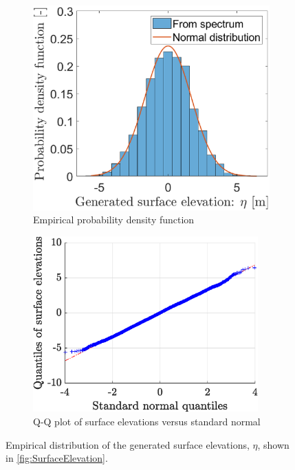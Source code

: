 \begin{figure}[htb]
\begin{subfigure}[t]{.5\textwidth}
    \centering
    \includegraphics[width=.95\textwidth,trim=0cm 0cm 0.0cm 0cm, clip=true]{Figures/Plots/etaIFFTdist}
    \caption{Empirical probability density function}
    \label{fig:etaIFFTHist}
\end{subfigure}%
\begin{subfigure}[t]{.5\textwidth}
    \centering
    \includegraphics[width=0.95\textwidth,trim=0cm 0cm 0cm 0cm, clip=true]{Figures/Plots/etaIFFqqplot}
    \caption{Q-Q plot of surface elevations versus standard normal}
    \label{fig:etaIFFTqqplot}
\end{subfigure}
\caption{Empirical distribution of the generated surface elevations, $\eta$, shown in \cref{fig:SurfaceElevation}.}
\label{fig:etaIFFTDistributions}
\end{figure}


